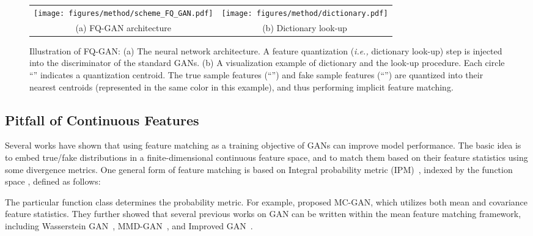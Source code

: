 \documentclass{article}
\newcommand{\ie}[0]{\emph{i.e., }}
\begin{document}
\begin{figure*}[t!]\vspace{-0mm}\centering
	\begin{tabular}{c c}
		\hspace{-0mm}
		\texttt{[image: figures/method/scheme\_FQ\_GAN.pdf]}  & 
\texttt{[image: figures/method/dictionary.pdf]} \\
		(a) FQ-GAN architecture \vspace{2mm} & 
		(b) Dictionary look-up \hspace{-0mm} \\ 
	\end{tabular}
	\vspace{-2mm}
	\caption{Illustration of FQ-GAN: (a) The neural network architecture. A feature quantization (\ie dictionary look-up) step  is injected into the discriminator of the standard GANs. (b) A visualization example of dictionary  and the look-up procedure. Each circle ``'' indicates a quantization centroid. The true sample features  (``'') and fake sample features  (``'') are quantized into their nearest centroids  (represented in the same color in this example), and thus performing implicit feature matching.
	 }
	\vspace{-2mm}
	\label{fig:fq_gan_illustration}
\end{figure*}



\subsection{Pitfall of Continuous Features}


Several works have shown that using feature matching as a training objective of GANs
can improve model performance. The basic idea is to embed true/fake distributions in a finite-dimensional continuous feature space, and to match them based on their feature statistics using some divergence metrics. One general form of feature matching  is based on Integral probability metric (IPM)~\cite{muller1997integral}, indexed by the function space , defined as follows:

The particular function class  determines the probability metric. For example, \citet{mroueh2017mcgan} proposed MC-GAN, which utilizes both mean and covariance feature statistics. They further showed that several previous works on GAN can be written within the mean feature matching framework, including Wasserstein GAN~\cite{arjovsky2017wasserstein}, MMD-GAN~\cite{li2017mmd}, and Improved GAN~\citep{salimans2016improved}. 
\end{document}
